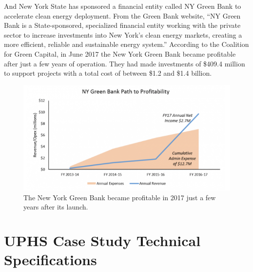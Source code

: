 \documentclass[hidelinks,12pt,a4paper]{article}
\begin{document}
And New York State has sponsored a financial entity called NY Green Bank to accelerate clean energy deployment. From the Green Bank website, “NY Green Bank is a State-sponsored, specialized financial entity working with the private sector to increase investments into New York’s clean energy markets, creating a more efficient, reliable and sustainable energy system.” \cite{NYGreenBank} According to the Coalition for Green Capital, in June 2017 the New York Green Bank became profitable after just a few years of operation. They had made investments of \$409.4 million to support projects with a total cost of between \$1.2 and \$1.4 billion. \cite{NYGreenBankPathToProfitability}

\begin{figure}[ht!]
    \centering
    \includegraphics[width=1\textwidth]{new-york-green-bank-path-to-profitability.png}
    \caption{The New York Green Bank became profitable in 2017 just a few years after its launch. \cite{NYGreenBankPathToProfitability}}
\end{figure}
\FloatBarrier

\pagebreak[1]
\section{UPHS Case Study Technical Specifications}
\end{document}

